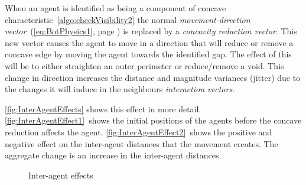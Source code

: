When an agent is identified as being a component of concave characteristic~\autoref{algo:checkVisibility2} the normal \textit{movement-direction vector}~(\autoref{eq:BotPhysics1}, page \pageref{eq:BotPhysics1}) is replaced by a \textit{concavity reduction vector}. This new vector causes the agent to move in a direction that will reduce or remove a concave edge by moving the agent towards the identified gap. The effect of this will be to either straighten an outer perimeter or reduce/remove a void. This change in direction increases the distance and magnitude variances (jitter) due to the changes it will induce in the neighbours \textit{interaction vectors}.

\autoref{fig:InterAgentEffects} shows this effect in more detail. \autoref{fig:InterAgentEffect1}~shows the initial positions of the agents before the concave reduction affects the agent. \autoref{fig:InterAgentEffect2}~shows the positive and negative effect on the inter-agent distances that the movement creates. The aggregate change is an increase in the inter-agent distances.

\begin{figure}[H]
\centering
{}
\caption{Inter-agent effects}
\label{fig:InterAgentEffects}
\end{figure}

